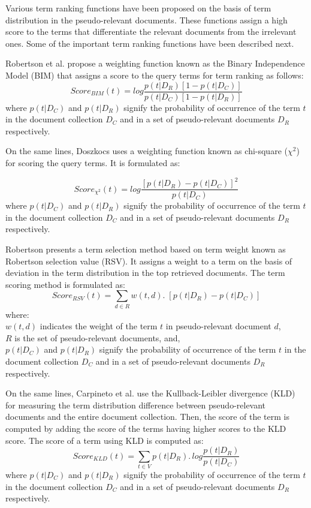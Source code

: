 Various term ranking functions have been proposed on the basis of term distribution in the pseudo-relevant documents. These functions assign a high score to the terms that differentiate the relevant documents from the irrelevant ones. Some of the important term ranking functions have been described next. 

Robertson et al. \cite{robertson1976relevance} propose a weighting function known as the Binary Independence Model (BIM) that assigns a score to the query terms for term ranking as follows:
\begin{equation}\label{eq:19}
Score_{BIM}(t)= log \frac{p(t|D_R) [1-p(t|D_C)]}{p(t|D_C) [1-p(t|D_R)]}
\end{equation}
where $p(t|D_C)$ and $p(t|D_R)$ signify the probability of occurrence of the term $t$ in the document collection $D_C$ and in a set of pseudo-relevant documents $D_R$ respectively. 

On the same lines, Doszkocs \cite{doszkocs1978aid}  uses a weighting function known as chi-square ($\chi^2$) for scoring the query terms. It is formulated as:

\begin{equation}
Score_{\chi^2}(t)= log \frac{[p(t|D_R)-p(t|D_C)]^2}{p(t|D_C)}
\end{equation}
where $p(t|D_C)$ and $p(t|D_R)$ signify the probability of occurrence of the term $t$ in the document collection $D_C$ and in a set of pseudo-relevant documents $D_R$ respectively.

Robertson \cite{robertson1990term} presents a term selection method based on term weight known as Robertson selection value (RSV). It assigns a weight to a term on the basis of deviation in the term distribution in the top retrieved documents. The term scoring method is formulated as:
\begin{equation}
Score_{RSV}(t)= \sum_{d\in R}w(t,d) . \;[p(t|D_R)-p(t|D_C)]
\end{equation}
where:\\ $w(t,d)$ indicates the weight of the term $t$ in pseudo-relevant document $d$,\\$R$ is the set of pseudo-relevant documents, and,\\ $p(t|D_C)$ and $p(t|D_R)$ signify the probability of occurrence of the term $t$ in the document collection $D_C$ and in a set of pseudo-relevant documents $D_R$ respectively.

On the same lines, Carpineto et al. \cite{carpineto2001information} use the Kullback-Leibler divergence (KLD) for measuring the term distribution difference between pseudo-relevant documents and the entire document collection. Then, the score of the term is computed by adding the score of the terms having higher scores to the KLD score. The score of a term using KLD is computed as:
\begin{equation}
Score_{KLD}(t)=\sum_{t\in V}p(t|D_R).\, log\frac{p(t|D_R)}{p(t|D_C)}
\end{equation}
where $p(t|D_C)$ and $p(t|D_R)$ signify the probability of occurrence of the term $t$ in the document collection $D_C$ and in a set of pseudo-relevant documents $D_R$ respectively.

